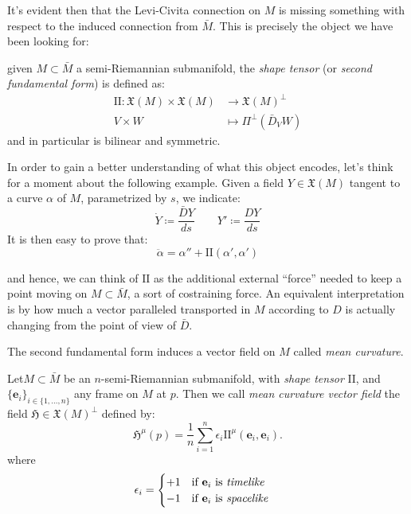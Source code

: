 It's evident then that the Levi-Civita connection on \(M\) is missing something with respect to the induced connection from \(\bar{M}\). This is precisely the object we have been looking for:

\begin{definition}
	given \(M \subset \bar{M}\) a semi-Riemannian submanifold, the \emph{shape tensor} (or \emph{second fundamental form}) is defined as:
	\begin{align*}
		\mathrm{I\!I} : \mathfrak{X}(M) \times \mathfrak{X}(M) &\longrightarrow \mathfrak{X}(M)^{\perp}\\
							V \times W &\mapsto \Pi^{\perp}\left(\bar{D}_V W\right)
	\end{align*}
	\noindent and in particular is bilinear and symmetric.
\end{definition}

In order to gain a better understanding of what this object encodes, let's think for a moment about the following example. Given a field \(Y \in \mathfrak{X}(M)\) tangent to a curve \(\alpha\) of \(M\), parametrized by \(s\), we indicate:
\[
\dot{Y} \coloneqq \frac{\bar{D}Y}{ds} \quad \quad Y' \coloneqq \frac{DY}{ds}
\]
It is then easy to prove that:
\[
\ddot{\alpha} = \alpha'' + \mathrm{I\!I}(\alpha', \alpha')
\]

and hence, we can think of \(\mathrm{I\!I}\) as the additional external ``force'' needed to keep a point moving on \(M \subset \bar{M}\), a sort of costraining force. An equivalent interpretation is by how much a vector paralleled transported in \(M\) according to \(D\) is actually changing from the point of view of \(\bar{D}\).



The second fundamental form induces a vector field on \(M\) called \emph{mean curvature}.
\begin{definition}
		Let\(M \subset \bar{M}\) be an  \(n\)-semi-Riemannian submanifold, with \emph{shape tensor} \(\mathrm{I\!I}\), and \(\{\textbf{e}_i\}_{i \in \{1, \ldots, n\}}\) any frame on \(M\) at \(p\). Then we call \emph{mean curvature vector field} the field \(\mathfrak{H} \in \mathfrak{X}(M)^{\perp} \) defined by:
		\[
		\mathfrak{H}^{\mu}(p) = \frac{1}{n} \sum_{i=1}^{n} \epsilon_i \mathrm{I\!I}^{\mu}(\textbf{e}_i, \textbf{e}_i).
		\]
		where 
		\[
		\epsilon_i = 
		\begin{cases}
		+1 \quad \text{if } \textbf{e}_i \text{ is \emph{timelike}} \\
		-1 \quad \text{if } \textbf{e}_i \text{ is \emph{spacelike}}
		\end{cases}
		\]
\end{definition}


